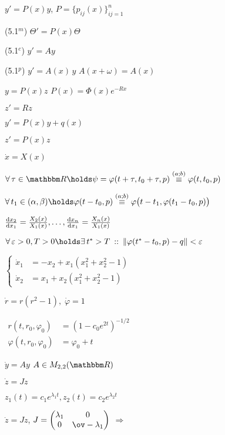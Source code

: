 \documentclass[timbord]{longnotes}
\begin{document}
\begin{list}
  \item $y' = P(x) y$, $P = \{p_{ij}(x)\}_{ij=1}^n$ 
  \item[(5.1$^m$)] $\Theta' = P(x) \Theta$ 
  \item[(5.1$^c$)] $y' = A y$ 
  \item[(5.1$^p$)] $y' = A(x)\, y$ \hfill $A(x+\omega) = A(x)$
  \item $y = P(x) z$ \hfill $P(x) = \Phi(x) e^{-Rx}$
  \item $z' = Rz$
  \item $y' = P(x)y+q(x)$
  \item $z' = P(x) z$
    \nch
  \item $\dot x = X(x)$
  \item $\forall\, \tau \in \R \holds \psi=\varphi(t+ \tau, t_0 + \tau, p) 
    \overset{(a;b)}{\equiv} \varphi(t,t_0,p)$
  \item $\forall\, t_1 \in (\alpha,\beta)\holds \varphi (t-t_0,p) \overset{(a;b)}{\equiv} 
    \varphi\bigl(t-t_1, \varphi(t_1 - t_0, p)\bigr)$
  \item $\fder{x_2}{x_1} = \frac{X_2(x)}{X_1(x)}, \dotsc, \fder{x_n}{x_1} =\frac{X_n(x)}{X_1(x)}$
  \item $\forall\, \varepsilon > 0, T>0 \holds \exists\, t^* > T \that
    \|\varphi(t^*-t_0,p)-q\|<\varepsilon$ \hfill 
    \skeq
  \item $\left\{\begin{aligned}
      \dot x_1 &= -x_2 + x_1(x_1^2 + x_2^2 - 1) \\
      \dot x_2 &= x_1 + x_2(x_1^2 + x_2^2 - 1)  
    \end{aligned}\right.$
  \item $\dot r = r(r^2 -1),\; \dot \varphi =1$
  \item $
    \begin{aligned}
      r(t,r_0, \varphi_0) &= (1-c_0 e^{2t})^{-1/2}\\
      \varphi(t,r_0, \varphi_0) &= \varphi_0 + t
    \end{aligned}
    $
  \item $\dot y = Ay$ \hfill $A\in M_{2,2} (\R)$ \skeq
  \item $\dot z = J z$
  \item $z_1(t) = c_1 e^{\lambda_1t}, z_2(t) = c_2 e^{\lambda_2t}$
  \item $\dot z = J z$, 
    $J = 
    \begin{pmatrix}
      \lambda_1 & 0 \\ 0 & \ov-\lambda_1
    \end{pmatrix}$ $ \Rightarrow $

\end{list}
\end{document}
